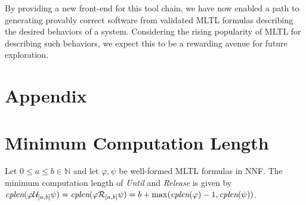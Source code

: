 \documentclass[runningheads]{llncs}
\renewcommand{\phi}{\varphi}
\begin{document}
By providing a new front-end for this tool chain, we have now enabled a path to generating provably correct software from validated MLTL formulas describing the desired behaviors of a system. Considering the rising popularity of MLTL for describing such behaviors, we expect this to be a rewarding avenue for future exploration. 


%
%
%
\newpage


\newpage
\appendix
\section*{Appendix} \label{Appendix}
\renewcommand{\thesection}{\Roman{section}}
\section{Minimum Computation Length}
\label{complen-proof}
\renewcommand\thetheorem{1}
\begin{theorem}
    Let $0 \leq a\leq b \in \mathbb{N}$ and let $\phi, \psi$ be well-formed MLTL formulas in NNF. The minimum computation length of \emph{Until} and \emph{Release} is given by $\emph{cplen}(\phi \mathcal{U}_{[a,b]} \psi) = \emph{cplen}(\phi \mathcal{R}_{[a,b]} \psi) = b + \max(\emph{cplen}(\phi)-1, \emph{cplen}(\psi))$.
\end{theorem}
\end{document}
